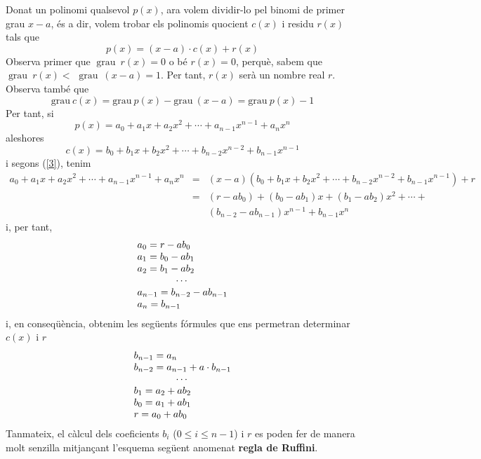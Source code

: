 Donat un polinomi qualsevol $p(x)$, ara volem dividir-lo pel binomi
de primer grau $x-a$, és a dir, volem trobar els polinomis quocient $c(x)$ i residu $r(x)$ tals que\begin{equation}
p(x)=(x-a)\cdot c(x)+r(x) \label{3}
\end{equation}Observa primer que $\operatorname{grau}~r(x)=0$ o bé $r(x)=0$, perquè, sabem que $\operatorname{grau}~r(x)<$ $\operatorname{grau}~(x-a)=1$. Per tant, $r(x)$ serà un nombre real $r$.
Observa també que\begin{equation*}
\text{grau}~c(x)=\text{grau}~p(x)-\text{grau}~(x-a)=\text{grau}~p(x)-1
\end{equation*}Per tant, si\begin{equation*}
p(x)=a_{0}+a_{1}x+a_{2}x^{2}+\cdots +a_{n-1}x^{n-1}+a_{n}x^{n}
\end{equation*}aleshores\begin{equation*}
c(x)=b_{0}+b_{1}x+b_{2}x^{2}+\cdots +b_{n-2}x^{n-2}+b_{n-1}x^{n-1}
\end{equation*}i segons (\ref{3}), tenim\begin{eqnarray*}
a_{0}+a_{1}x+a_{2}x^{2}+\cdots +a_{n-1}x^{n-1}+a_{n}x^{n}
&=&(x-a)(b_{0}+b_{1}x+b_{2}x^{2}+\cdots +b_{n-2}x^{n-2}+b_{n-1}x^{n-1})+r \\
&=&(r-ab_{0})+(b_{0}-ab_{1})x+(b_{1}-ab_{2})x^{2}+\cdots + \\
&&(b_{n-2}-ab_{n-1})x^{n-1}+b_{n-1}x^{n}
\end{eqnarray*}i, per tant,\begin{equation*}
\begin{array}{l}
a_{0}=r-ab_{0} \\
a_{1}=b_{0}-ab_{1} \\
a_{2}=b_{1}-ab_{2} \\
\multicolumn{1}{c}{\cdots} \\
a_{n-1}=b_{n-2}-ab_{n-1} \\
a_{n}=b_{n-1}\end{array}\end{equation*}i, en conseqüència, obtenim les següents fórmules que ens permetran determinar $c(x)$ i $r$\begin{equation*}
\begin{array}{l}
b_{n-1}=a_{n} \\
b_{n-2}=a_{n-1}+a\cdot b_{n-1} \\
\multicolumn{1}{c}{\cdots} \\
b_{1}=a_{2}+ab_{2} \\
b_{0}=a_{1}+ab_{1} \\
r=a_{0}+ab_{0}\end{array}\end{equation*}Tanmateix, el càlcul dels coeficients $b_{i}$ ($0\leq i\leq n-1$)
i $r$ es poden fer de manera molt senzilla mitjançant l'esquema següent
anomenat \textbf{regla de Ruffini}.

